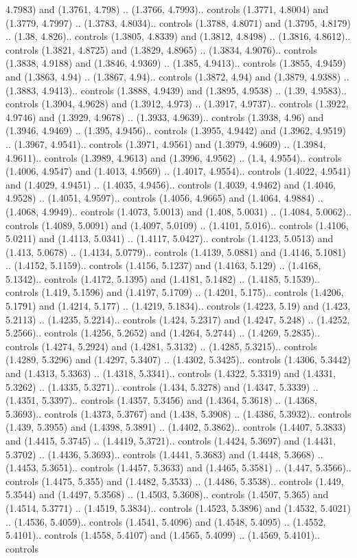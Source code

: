 4.7983) and (1.3761, 4.798) .. (1.3766, 4.7993).. controls (1.3771, 4.8004) and (1.3779, 4.7997) .. (1.3783, 4.8034).. controls (1.3788, 4.8071) and (1.3795, 4.8179) .. (1.38, 4.826).. controls (1.3805, 4.8339) and (1.3812, 4.8498) .. (1.3816, 4.8612).. controls (1.3821, 4.8725) and (1.3829, 4.8965) .. (1.3834, 4.9076).. controls (1.3838, 4.9188) and (1.3846, 4.9369) .. (1.385, 4.9413).. controls (1.3855, 4.9459) and (1.3863, 4.94) .. (1.3867, 4.94).. controls (1.3872, 4.94) and (1.3879, 4.9388) .. (1.3883, 4.9413).. controls (1.3888, 4.9439) and (1.3895, 4.9538) .. (1.39, 4.9583).. controls (1.3904, 4.9628) and (1.3912, 4.973) .. (1.3917, 4.9737).. controls (1.3922, 4.9746) and (1.3929, 4.9678) .. (1.3933, 4.9639).. controls (1.3938, 4.96) and (1.3946, 4.9469) .. (1.395, 4.9456).. controls (1.3955, 4.9442) and (1.3962, 4.9519) .. (1.3967, 4.9541).. controls (1.3971, 4.9561) and (1.3979, 4.9609) .. (1.3984, 4.9611).. controls (1.3989, 4.9613) and (1.3996, 4.9562) .. (1.4, 4.9554).. controls (1.4006, 4.9547) and (1.4013, 4.9569) .. (1.4017, 4.9554).. controls (1.4022, 4.9541) and (1.4029, 4.9451) .. (1.4035, 4.9456).. controls (1.4039, 4.9462) and (1.4046, 4.9528) .. (1.4051, 4.9597).. controls (1.4056, 4.9665) and (1.4064, 4.9884) .. (1.4068, 4.9949).. controls (1.4073, 5.0013) and (1.408, 5.0031) .. (1.4084, 5.0062).. controls (1.4089, 5.0091) and (1.4097, 5.0109) .. (1.4101, 5.016).. controls (1.4106, 5.0211) and (1.4113, 5.0341) .. (1.4117, 5.0427).. controls (1.4123, 5.0513) and (1.413, 5.0678) .. (1.4134, 5.0779).. controls (1.4139, 5.0881) and (1.4146, 5.1081) .. (1.4152, 5.1159).. controls (1.4156, 5.1237) and (1.4163, 5.129) .. (1.4168, 5.1342).. controls (1.4172, 5.1395) and (1.4181, 5.1482) .. (1.4185, 5.1539).. controls (1.419, 5.1596) and (1.4197, 5.1709) .. (1.4201, 5.175).. controls (1.4206, 5.1791) and (1.4214, 5.177) .. (1.4219, 5.1834).. controls (1.4223, 5.19) and (1.423, 5.2113) .. (1.4235, 5.2214).. controls (1.424, 5.2317) and (1.4247, 5.248) .. (1.4252, 5.2566).. controls (1.4256, 5.2652) and (1.4264, 5.2744) .. (1.4269, 5.2835).. controls (1.4274, 5.2924) and (1.4281, 5.3132) .. (1.4285, 5.3215).. controls (1.4289, 5.3296) and (1.4297, 5.3407) .. (1.4302, 5.3425).. controls (1.4306, 5.3442) and (1.4313, 5.3363) .. (1.4318, 5.3341).. controls (1.4322, 5.3319) and (1.4331, 5.3262) .. (1.4335, 5.3271).. controls (1.434, 5.3278) and (1.4347, 5.3339) .. (1.4351, 5.3397).. controls (1.4357, 5.3456) and (1.4364, 5.3618) .. (1.4368, 5.3693).. controls (1.4373, 5.3767) and (1.438, 5.3908) .. (1.4386, 5.3932).. controls (1.439, 5.3955) and (1.4398, 5.3891) .. (1.4402, 5.3862).. controls (1.4407, 5.3833) and (1.4415, 5.3745) .. (1.4419, 5.3721).. controls (1.4424, 5.3697) and (1.4431, 5.3702) .. (1.4436, 5.3693).. controls (1.4441, 5.3683) and (1.4448, 5.3668) .. (1.4453, 5.3651).. controls (1.4457, 5.3633) and (1.4465, 5.3581) .. (1.447, 5.3566).. controls (1.4475, 5.355) and (1.4482, 5.3533) .. (1.4486, 5.3538).. controls (1.449, 5.3544) and (1.4497, 5.3568) .. (1.4503, 5.3608).. controls (1.4507, 5.365) and (1.4514, 5.3771) .. (1.4519, 5.3834).. controls (1.4523, 5.3896) and (1.4532, 5.4021) .. (1.4536, 5.4059).. controls (1.4541, 5.4096) and (1.4548, 5.4095) .. (1.4552, 5.4101).. controls (1.4558, 5.4107) and (1.4565, 5.4099) .. (1.4569, 5.4101).. controls 